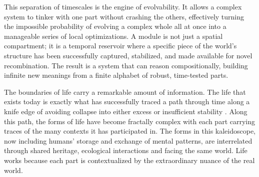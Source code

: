 \documentclass[12pt]{article}
\begin{document}
This separation of timescales is the engine of evolvability. It allows a complex system to tinker with one part without crashing the others, effectively turning the impossible probability of evolving a complex whole all at once into a manageable series of local optimizations. A module is not just a spatial compartment; it is a temporal reservoir where a specific piece of the world's structure has been successfully captured, stabilized, and made available for novel recombination. The result is a system that can reason compositionally, building infinite new meanings from a finite alphabet of robust, time-tested parts.




The boundaries of life carry a remarkable amount of information. The life that exists today is exactly what has successfully traced a path through time along a knife edge of avoiding collapse into either excess or insufficient stability \citep{schrodinger1944what, kauffman1993origins, bak2013nature, prigogine1984order, kirchhoff2018markov}. Along this path, the forms of life have become fractally complex with each part carrying traces of the many contexts it has participated in. The forms in this kaleidoscope, now including humans' storage and exchange of mental patterns, are interrelated through shared heritage, ecological interactions and facing the same world. Life works because each part is contextualized by the extraordinary nuance of the real world. 










\end{document}
